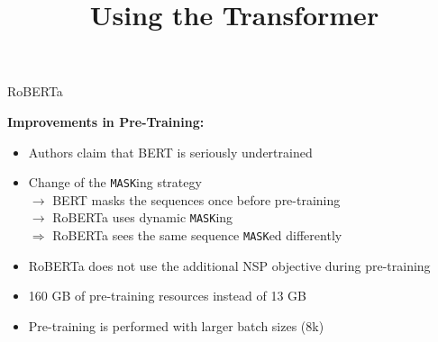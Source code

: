 



\newcommand{\titlefigure}{figure/sesamestreet.jpeg}
\newcommand{\learninggoals}{
\item Understand the improvements over BERT
\item Dynamic Masking}

\title{Using the Transformer}
\date{}




\begin{frame}{RoBERTa \href{https://arxiv.org/pdf/1907.11692.pdf}{}}

\vspace{1cm}

	\textbf{Improvements in Pre-Training:}

	\begin{itemize}
		\item Authors claim that BERT is seriously undertrained
		\item Change of the \texttt{MASK}ing strategy  \\
					$\rightarrow$ BERT masks the sequences once before pre-training  \\
					$\rightarrow$ RoBERTa uses dynamic \texttt{MASK}ing  \\
					$\Rightarrow$ RoBERTa sees the same sequence \texttt{MASK}ed differently
		\item RoBERTa does not use the additional NSP objective during pre-training
		\item 160 GB of pre-training resources instead of 13 GB
		\item Pre-training is performed with larger batch sizes (8k)
	\end{itemize}
\end{frame}


